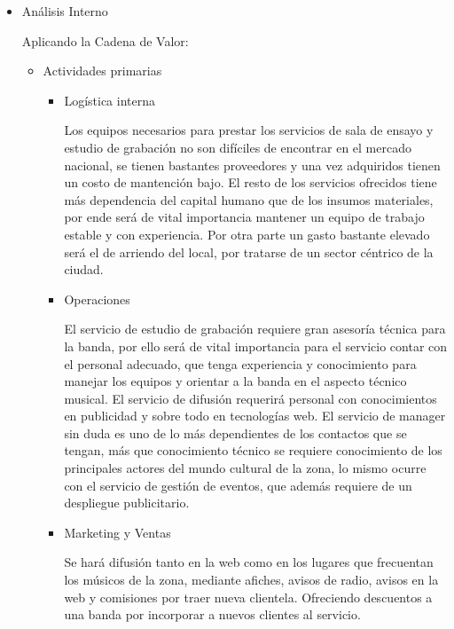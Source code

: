 \begin{itemize}
\item{Análisis Interno}

Aplicando la Cadena de Valor:

\begin{itemize}
\item Actividades primarias
	\begin{itemize}
		\item Logística interna

			Los equipos necesarios para prestar los servicios de sala de ensayo y estudio de grabación no son difíciles de encontrar en el mercado nacional, se tienen bastantes proveedores y una vez adquiridos tienen un costo de mantención bajo. El resto de los servicios ofrecidos tiene más dependencia del capital humano que de los insumos materiales, por ende será de vital importancia mantener un equipo de trabajo estable y con experiencia. Por otra parte un gasto bastante elevado será el de arriendo del local, por tratarse de un sector céntrico de la ciudad. 
		\item Operaciones

			El servicio de estudio de grabación requiere gran asesoría técnica para la banda, por ello será de vital importancia para el servicio contar con el personal adecuado, que tenga experiencia y conocimiento para manejar los equipos y orientar a la banda en el aspecto técnico musical.  El servicio de difusión requerirá personal con conocimientos en publicidad y sobre todo en tecnologías web. El servicio de manager sin duda es uno de lo más dependientes de los contactos que se tengan, más que conocimiento técnico se requiere conocimiento de los principales actores del mundo cultural de la zona, lo mismo ocurre con el servicio de gestión de eventos, que además requiere de un despliegue publicitario.
		\item Marketing y Ventas

			Se hará difusión tanto en la web como en los lugares que frecuentan los músicos de la zona, mediante afiches, avisos de radio, avisos en la web y comisiones por traer nueva clientela. Ofreciendo descuentos a una banda por incorporar a nuevos clientes al servicio.


\end{itemize}
\end{itemize}
\end{itemize}
